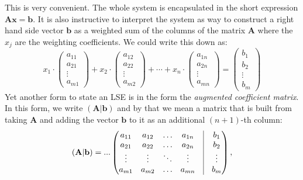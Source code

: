 This is very convenient. The whole system is encapsulated in the short expression $\mathbf{A x} = \mathbf{b}$. It is also instructive to interpret the system as way to construct a right hand side vector $\mathbf{b}$ as a weighted sum of the columns of the matrix $\mathbf{A}$ where the $x_j$ are the weighting coefficients. We could write this down as:
\begin{equation}
x_1 \cdot \begin{pmatrix} a_{11} \\ a_{21} \\ \vdots \\ a_{m1} \end{pmatrix} + 
x_2 \cdot \begin{pmatrix} a_{12} \\ a_{22} \\ \vdots \\ a_{m2} \end{pmatrix} + 
\cdots +
x_n \cdot \begin{pmatrix} a_{1n} \\ a_{2n} \\ \vdots \\ a_{mn} \end{pmatrix} 
= 
\begin{pmatrix} b_1 \\ b_2 \\ \vdots \\ b_m \end{pmatrix}
\end{equation}
Yet another form to state an LSE is in the form the \emph{augmented coefficient matrix}. In this form, we write $(\mathbf{A|b})$ and by that we mean a matrix that is built from taking $\mathbf{A}$ and adding the vector $\mathbf{b}$ to it as an additional $(n+1)$-th column:
\begin{equation}
(\mathbf{A|b}) = ...
\begin{pmatrix}
a_{11} & a_{12} & \ldots & a_{1n} & \vline & b_1    \\
a_{21} & a_{22} & \ldots & a_{2n} & \vline & b_2    \\ 
\vdots & \vdots & \ddots & \vdots & \vline & \vdots \\
a_{m1} & a_{m2} & \ldots & a_{mn} & \vline & b_m  
\end{pmatrix},
\end{equation}



